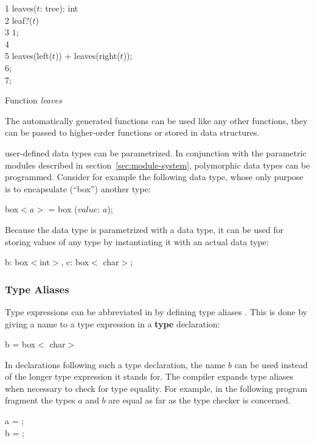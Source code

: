 \begin{Program}
\begin{ttlprog}
1\>\ttlFun{} leaves($t$: tree): int\\
2\>\>\ttlIf{} leaf?($t$) \ttlThen{}\\
3\>\>\>\ttlReturn{} $1$;\\
4\>\>\ttlElse{}\\
5\>\>\>\ttlReturn{} leaves(left($t$)) + leaves(right($t$));\\
6\>\>\ttlEnd{};\\
7\>\ttlEnd{};
\end{ttlprog}
\caption{Function {\em leaves}}
\label{prog:tree-leaves}
\end{Program}

The automatically generated functions can be used like any other
\turtle{} functions, they can be passed to higher-order functions or
stored in data structures.

\turtle{} user-defined data types can be parametrized.  In conjunction
with the parametric modules described in
section~\ref{sec:module-system}, polymorphic data types can be
programmed.  Consider for example the following data type, whose only
purpose is to encapsulate (``box'') another type:

\begin{ttlprog}
\>\ttlDatatype{} box$<a>$ = box ($value$: $a$);
\end{ttlprog}

Because the data type is parametrized with a data type, it can be used
for storing values of any type by instantiating it with an actual data
type:

\begin{ttlprog}
\>\ttlVar{} b: box$<$int$>$, c: box$<$\ttlArray{} \ttlOf{} char$>$;
\end{ttlprog}

\subsubsection{Type Aliases}

Type expressions can be abbreviated in \turtle{} by defining type
aliases%
%
%
.  This is done by giving a name to a type
expression in a {\bf type} declaration:
%
\begin{ttlprog}
\>\ttlType{} b = box$<$\ttlArray{} \ttlOf{} char$>$
\end{ttlprog}
%
In declarations following such a type declaration, the name $b$ can be
used instead of the longer type expression it stands for.  The
compiler expands type aliases when necessary to check for type
equality.  For example, in the following program fragment the types
$a$ and $b$ are equal as far as the type checker is concerned.
%
\begin{ttlprog}
\>\ttlType{} a = \ttlArray{} \ttlOf{} \ttlString{};\\
\>\ttlType{} b = \ttlArray{} \ttlOf{} \ttlString{};
\end{ttlprog}

